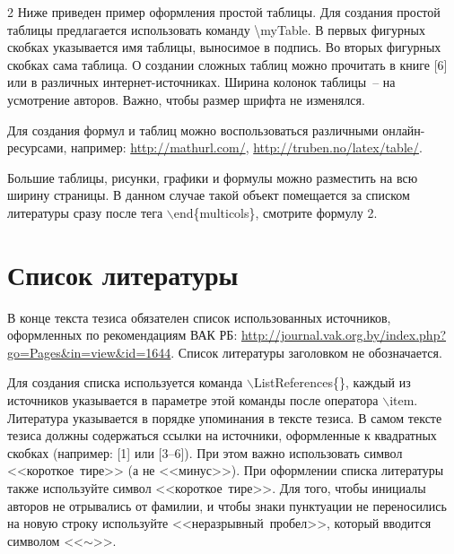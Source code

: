 \documentclass[a4paper,10pt,twoside]{article}
\begin{document}
\begin{multicols}{2}
Ниже приведен пример оформления простой таблицы. 
Для создания простой таблицы предлагается использовать команду \textbackslash myTable. В первых фигурных скобках указывается имя таблицы, выносимое в подпись. Во вторых фигурных скобках сама таблица. 
О создании сложных таблиц можно прочитать в книге [6] или в различных интернет-источниках.
Ширина колонок таблицы~-- на усмотрение авторов. Важно, чтобы размер шрифта не изменялся.

Для создания формул и таблиц можно воспользоваться различными онлайн-ресурсами, например:
\url{http://mathurl.com/}, \url{http://truben.no/latex/table/}.

Большие таблицы, рисунки, графики и формулы можно разместить на всю ширину страницы. В данном случае такой объект помещается за списком литературы сразу после тега $\backslash$end\{multicols\}, смотрите формулу 2.

\section{Список литературы }

В конце текста тезиса обязателен список использованных источников, оформленных по рекомендациям ВАК РБ: \url{http://journal.vak.org.by/index.php?go=Pages&in=view&id=1644}. Список литературы заголовком не обозначается. 

Для создания списка используется команда $\backslash$ListReferences\{\}, каждый из источников указывается в параметре этой команды после оператора $\backslash$item. Литература указывается в порядке упоминания в тексте тезиса. В самом тексте тезиса должны содержаться ссылки на источники, оформленные к квадратных скобках (например: [1] или [3--6]). При этом важно использовать символ <<короткое~тире>> (а не <<минус>>). При оформлении списка литературы также используйте символ <<короткое~тире>>. Для того, чтобы инициалы авторов не отрывались от фамилии, и чтобы знаки пунктуации не переносились на новую строку используйте <<неразрывный~пробел>>, который вводится символом <<$\sim$>>.






\end{multicols}
\end{document}
